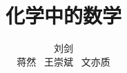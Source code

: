 \documentclass[12pt, openany]{book}
\begin{document}
    \title{\heiti 化学中的数学}
    \author{\kaishu 刘剑 \\ \kaishu 蒋然 \ \kaishu 王崇斌 \ \kaishu 文亦质}
    \maketitle
    \tableofcontents

    \setlength\parskip{0.62 em}
    \mainmatter
 
    
    
    
    
    
    
    
    
    
    
\end{document}
